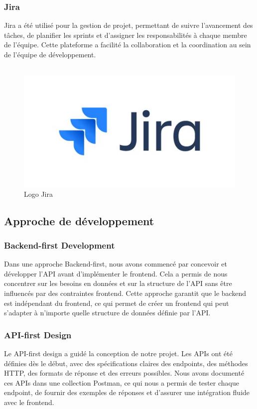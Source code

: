 \subsubsection*{Jira}
Jira a été utilisé pour la gestion de projet, permettant de suivre l'avancement des tâches, de planifier les sprints et d'assigner les responsabilités à chaque membre de l'équipe. Cette plateforme a facilité la collaboration et la coordination au sein de l'équipe de développement.\\\\

\begin{figure}[H]
\begin{center}
\includegraphics[width=15cm]{assets/presentation/JIRA.jpeg}
\end{center}
\caption{Logo Jira}
\end{figure}


\subsection*{Approche de développement}
\subsubsection*{Backend-first Development}
Dans une approche Backend-first, nous avons commencé par concevoir et développer l'API avant d'implémenter le frontend. Cela a permis de nous concentrer sur les besoins en données et sur la structure de l'API sans être influencés par des contraintes frontend. Cette approche garantit que le backend est indépendant du frontend, ce qui permet de créer un frontend qui peut s'adapter à n'importe quelle structure de données définie par l'API.

\subsubsection*{API-first Design}
Le API-first design a guidé la conception de notre projet. Les APIs ont été définies dès le début, avec des spécifications claires des endpoints, des méthodes HTTP, des formats de réponse et des erreurs possibles. Nous avons documenté ces APIs dans une collection Postman, ce qui nous a permis de tester chaque endpoint, de fournir des exemples de réponses et d’assurer une intégration fluide avec le frontend.


